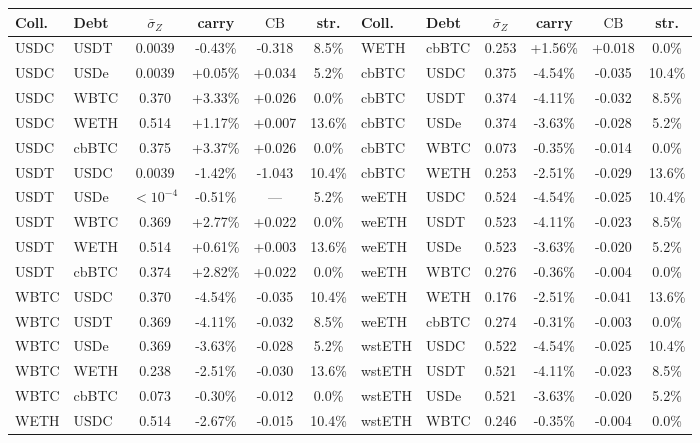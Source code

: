 \documentclass[11pt]{article}
\theoremstyle{plain}
\theoremstyle{definition}
\theoremstyle{remark}
\begin{document}
\begin{table}[ht]
\centering\footnotesize
\setlength{\tabcolsep}{3pt}
\begin{tabular}{llcccc@{\hspace{8pt}}llcccc}
\toprule
Coll. & Debt & $\bar\sigma_Z$ & carry & $\mathrm{CB}$ & str. &
Coll. & Debt & $\bar\sigma_Z$ & carry & $\mathrm{CB}$ & str. \\
\midrule
USDC & USDT & 0.0039 & -0.43\% & -0.318 & 8.5\% & WETH & cbBTC & 0.253 & +1.56\% & +0.018 & 0.0\% \\
USDC & USDe & 0.0039 & +0.05\% & +0.034 & 5.2\% & cbBTC & USDC & 0.375 & -4.54\% & -0.035 & 10.4\% \\
USDC & WBTC & 0.370 & +3.33\% & +0.026 & 0.0\% & cbBTC & USDT & 0.374 & -4.11\% & -0.032 & 8.5\% \\
USDC & WETH & 0.514 & +1.17\% & +0.007 & 13.6\% & cbBTC & USDe & 0.374 & -3.63\% & -0.028 & 5.2\% \\
USDC & cbBTC & 0.375 & +3.37\% & +0.026 & 0.0\% & cbBTC & WBTC & 0.073 & -0.35\% & -0.014 & 0.0\% \\
USDT & USDC & 0.0039 & -1.42\% & -1.043 & 10.4\% & cbBTC & WETH & 0.253 & -2.51\% & -0.029 & 13.6\% \\
USDT & USDe & ${<}10^{-4}$ & -0.51\% & --- & 5.2\% & weETH & USDC & 0.524 & -4.54\% & -0.025 & 10.4\% \\
USDT & WBTC & 0.369 & +2.77\% & +0.022 & 0.0\% & weETH & USDT & 0.523 & -4.11\% & -0.023 & 8.5\% \\
USDT & WETH & 0.514 & +0.61\% & +0.003 & 13.6\% & weETH & USDe & 0.523 & -3.63\% & -0.020 & 5.2\% \\
USDT & cbBTC & 0.374 & +2.82\% & +0.022 & 0.0\% & weETH & WBTC & 0.276 & -0.36\% & -0.004 & 0.0\% \\
WBTC & USDC & 0.370 & -4.54\% & -0.035 & 10.4\% & weETH & WETH & 0.176 & -2.51\% & -0.041 & 13.6\% \\
WBTC & USDT & 0.369 & -4.11\% & -0.032 & 8.5\% & weETH & cbBTC & 0.274 & -0.31\% & -0.003 & 0.0\% \\
WBTC & USDe & 0.369 & -3.63\% & -0.028 & 5.2\% & wstETH & USDC & 0.522 & -4.54\% & -0.025 & 10.4\% \\
WBTC & WETH & 0.238 & -2.51\% & -0.030 & 13.6\% & wstETH & USDT & 0.521 & -4.11\% & -0.023 & 8.5\% \\
WBTC & cbBTC & 0.073 & -0.30\% & -0.012 & 0.0\% & wstETH & USDe & 0.521 & -3.63\% & -0.020 & 5.2\% \\
WETH & USDC & 0.514 & -2.67\% & -0.015 & 10.4\% & wstETH & WBTC & 0.246 & -0.35\% & -0.004 & 0.0\% \\

\end{tabular}
\end{table}
\end{document}
